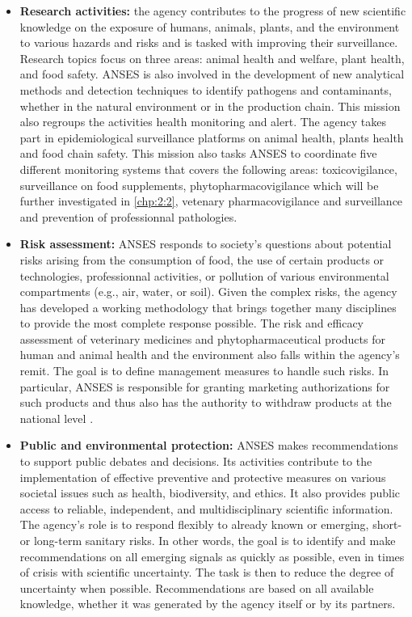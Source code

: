 \begin{itemize}
\item \textbf{Research activities:} the agency contributes to the progress of new scientific knowledge on the exposure of humans, animals, plants, and the environment to various hazards and risks and is tasked with improving their surveillance. Research topics focus on three areas: animal health and welfare, plant health, and food safety. ANSES is also involved in the development of new analytical methods and detection techniques to identify pathogens and contaminants, whether in the natural environment or in the production chain. This mission also regroups the activities health monitoring and alert. The agency takes part in epidemiological surveillance platforms on animal health, plants health and food chain safety. This mission also tasks ANSES to coordinate five different monitoring systems that covers the following areas: toxicovigilance, surveillance on food supplements, phytopharmacovigilance which will be further investigated in \ref{chp:2:2}, vetenary pharmacovigilance and surveillance and prevention of professionnal pathologies.      
\item \textbf{Risk assessment:} ANSES responds to society's questions about potential risks arising from the consumption of food, the use of certain products or technologies, professionnal activities, or pollution of various environmental compartments (e.g., air, water, or soil). Given the complex risks, the agency has developed a working methodology that brings together many disciplines to provide the most complete response possible. The risk and efficacy assessment of veterinary medicines and phytopharmaceutical products for human and animal health and the environment also falls within the agency's remit. The goal is to define management measures to handle such risks. In particular, ANSES is responsible for granting marketing authorizations for such products and thus also has the authority to withdraw products at the national level \cite{ansesdec}. 
\item \textbf{Public and environmental protection:} ANSES makes recommendations to support public debates and decisions. Its activities contribute to the implementation of effective preventive and protective measures on various societal issues such as health, biodiversity, and ethics. It also provides public access to reliable, independent, and multidisciplinary scientific information. The agency's role is to respond flexibly to already known or emerging, short- or long-term sanitary risks. In other words, the goal is to identify and make recommendations on all emerging signals as quickly as possible, even in times of crisis with scientific uncertainty. The task is then to reduce the degree of uncertainty when possible. Recommendations are based on all available knowledge, whether it was generated by the agency itself or by its partners. 
\end{itemize}

